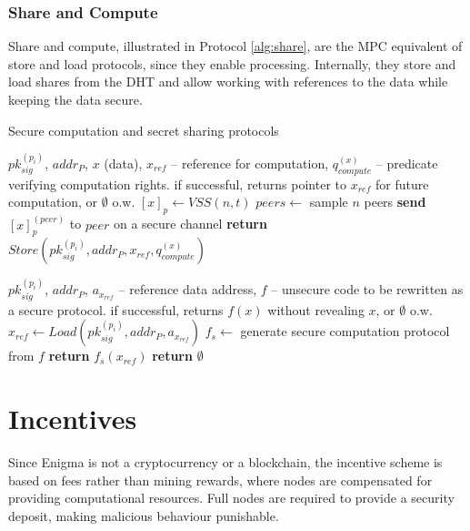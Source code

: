 \documentclass{article} \usepackage{nips13submit_e,times}
\begin{document}
\subsubsection{Share and Compute}

Share and compute, illustrated in Protocol \ref{alg:share}, are the MPC equivalent of store and load protocols, since they enable processing. Internally, they store and load shares from the DHT and allow working with references to the data while keeping the data secure.

\begin{algorithm}
\caption{Secure computation and secret sharing protocols}\label{alg:share}
\begin{algorithmic}
\Require $pk^{(p_i)}_{sig}$, $addr_P$, $x$ (data), $x_{ref}$ -- reference for computation, $q_{compute}^{(x)}$ -- predicate verifying computation rights.
\Ensure if successful, returns pointer to $x_{ref}$ for future computation, or $\emptyset$ o.w.
	\State $[x]_p \gets VSS(n, t)$
	\State $peers \gets$ sample $n$ peers
		\State \textbf{send} $[x]_p^{(peer)}$ to $peer$ on a secure channel
	\EndFor
	\State \textbf{return} $Store(pk^{(p_i)}_{sig},addr_P,x_{ref},q_{compute}^{(x)})$
\EndProcedure

\Require $pk^{(p_i)}_{sig}$, $addr_P$, $a_{x_{ref}}$ -- reference data address, $f$ -- unsecure code to be rewritten as a secure protocol.
\Ensure if successful, returns $f(x)$ without revealing  $x$, or $\emptyset$ o.w.
	\State $x_{ref} \gets Load(pk^{(p_i)}_{sig},addr_P, a_{x_{ref}})$
		\State $f_s \gets$ generate secure computation protocol from $f$
		\State \textbf{return} $f_s(x_{ref})$
	\EndIf
	\State \textbf{return} $\emptyset$
\EndProcedure
\end{algorithmic}
\end{algorithm}







\section{Incentives}

Since Enigma is not a cryptocurrency or a blockchain, the incentive scheme is based on fees rather than mining rewards, where nodes are compensated for providing computational resources. Full nodes are required to provide a security deposit, making malicious behaviour punishable.
\end{document}
